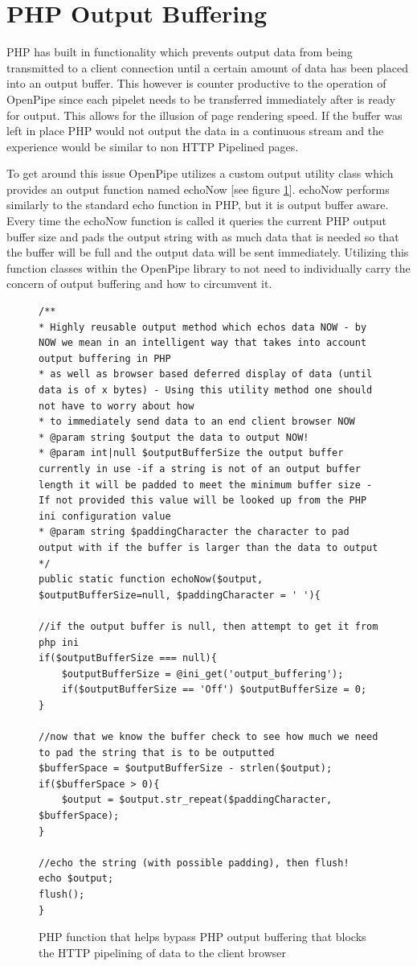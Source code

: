 \documentclass[12pt]{report}
\begin{document}
\section{PHP Output Buffering}
PHP has built in functionality which prevents output data from being transmitted
to a client connection until a certain amount of data has been placed into an output buffer. This however is counter productive to the operation of OpenPipe since each pipelet needs to be transferred immediately after is ready for output. This allows for the illusion of page rendering speed. If the buffer was left in place PHP would not output the data in a continuous stream and the experience would be similar to non HTTP Pipelined pages. 

To get around this issue OpenPipe utilizes a custom output utility class which provides an output function named echoNow [see figure \ref{fig:echoNowCode}]. echoNow performs similarly to the standard echo function in PHP, but it is output buffer aware. Every time the echoNow function is called it queries the current PHP output buffer size and pads the output string with as much data that is needed so that the buffer will be full and the output data will be sent immediately. Utilizing this function classes within the OpenPipe library to not need to individually carry the concern of output buffering and how to circumvent it.

\begin{figure}[H]
\label{fig:echoNowCode}
\begin{lstlisting}
/**
* Highly reusable output method which echos data NOW - by NOW we mean in an intelligent way that takes into account output buffering in PHP
* as well as browser based deferred display of data (until data is of x bytes) - Using this utility method one should not have to worry about how 
* to immediately send data to an end client browser NOW
* @param string $output the data to output NOW!
* @param int|null $outputBufferSize the output buffer currently in use -if a string is not of an output buffer length it will be padded to meet the minimum buffer size - If not provided this value will be looked up from the PHP ini configuration value 
* @param string $paddingCharacter the character to pad output with if the buffer is larger than the data to output
*/
public static function echoNow($output, $outputBufferSize=null, $paddingCharacter = ' '){

//if the output buffer is null, then attempt to get it from php ini
if($outputBufferSize === null){
	$outputBufferSize = @ini_get('output_buffering');
	if($outputBufferSize == 'Off') $outputBufferSize = 0;
}
		
//now that we know the buffer check to see how much we need to pad the string that is to be outputted
$bufferSpace = $outputBufferSize - strlen($output);
if($bufferSpace > 0){
	$output = $output.str_repeat($paddingCharacter, $bufferSpace);
}

//echo the string (with possible padding), then flush!
echo $output;
flush();
}
\end{lstlisting}
\caption{PHP function that helps bypass PHP output buffering that blocks the HTTP pipelining of data to the client browser}
\end{figure}
\end{document}
